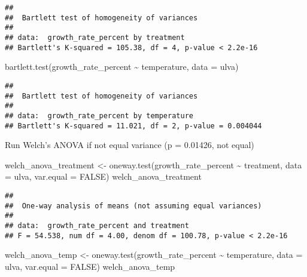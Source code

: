 \documentclass[
]{article}
\newenvironment{Shaded}{\begin{snugshade}}{\end{snugshade}}
\newcommand{\AttributeTok}[1]{\textcolor[rgb]{0.77,0.63,0.00}{#1}}
\newcommand{\ConstantTok}[1]{\textcolor[rgb]{0.00,0.00,0.00}{#1}}
\newcommand{\FunctionTok}[1]{\textcolor[rgb]{0.00,0.00,0.00}{#1}}
\newcommand{\NormalTok}[1]{#1}
\newcommand{\OtherTok}[1]{\textcolor[rgb]{0.56,0.35,0.01}{#1}}
\newcommand{\SpecialCharTok}[1]{\textcolor[rgb]{0.00,0.00,0.00}{#1}}
\begin{document}
\begin{verbatim}
## 
##  Bartlett test of homogeneity of variances
## 
## data:  growth_rate_percent by treatment
## Bartlett's K-squared = 105.38, df = 4, p-value < 2.2e-16
\end{verbatim}

\begin{Shaded}
\begin{Highlighting}[]
\FunctionTok{bartlett.test}\NormalTok{(growth\_rate\_percent }\SpecialCharTok{\textasciitilde{}}\NormalTok{ temperature, }\AttributeTok{data =}\NormalTok{ ulva)}
\end{Highlighting}
\end{Shaded}

\begin{verbatim}
## 
##  Bartlett test of homogeneity of variances
## 
## data:  growth_rate_percent by temperature
## Bartlett's K-squared = 11.021, df = 2, p-value = 0.004044
\end{verbatim}

Run Welch's ANOVA if not equal variance (p = 0.01426, not equal)

\begin{Shaded}
\begin{Highlighting}[]
\NormalTok{welch\_anova\_treatment }\OtherTok{\textless{}{-}} \FunctionTok{oneway.test}\NormalTok{(growth\_rate\_percent }\SpecialCharTok{\textasciitilde{}}\NormalTok{ treatment, }\AttributeTok{data =}\NormalTok{ ulva, }\AttributeTok{var.equal =} \ConstantTok{FALSE}\NormalTok{)}
\NormalTok{welch\_anova\_treatment}
\end{Highlighting}
\end{Shaded}

\begin{verbatim}
## 
##  One-way analysis of means (not assuming equal variances)
## 
## data:  growth_rate_percent and treatment
## F = 54.538, num df = 4.00, denom df = 100.78, p-value < 2.2e-16
\end{verbatim}

\begin{Shaded}
\begin{Highlighting}[]
\NormalTok{welch\_anova\_temp }\OtherTok{\textless{}{-}} \FunctionTok{oneway.test}\NormalTok{(growth\_rate\_percent }\SpecialCharTok{\textasciitilde{}}\NormalTok{ temperature, }\AttributeTok{data =}\NormalTok{ ulva, }\AttributeTok{var.equal =} \ConstantTok{FALSE}\NormalTok{)}
\NormalTok{welch\_anova\_temp}
\end{Highlighting}
\end{Shaded}
\end{document}
